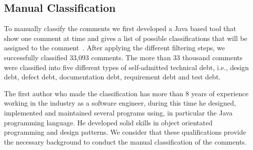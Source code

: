 \subsection{Manual Classification} %
\label{sub:manual_classification}
To manually classify the comments we first developed a Java based tool that show one comment at time and gives a list of possible classifications  that will be assigned to the comment~\cite{Alves2014MTD}. After applying the different filtering steps, we successfully classified 33,093 comments. The more than 33 thousand comments were classified into five different types of self-admitted technical debt, i.e., design debt, defect debt, documentation debt, requirement debt and test debt.

The first author who made the classification has more than 8 years of experience working in the industry as a software engineer, during this time he designed, implemented and maintained several programs using, in particular the Java programming language. He developed solid skills in object orientated programming and design patterns. We consider that these qualifications provide the necessary background to conduct the manual classification of the comments.   
